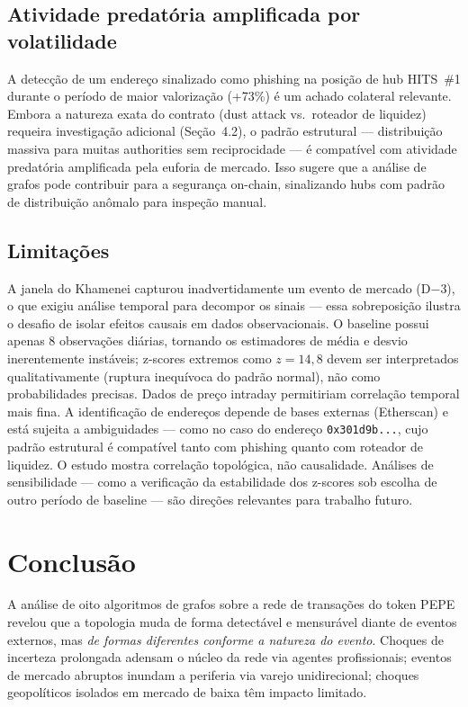 \documentclass[12pt,a4paper]{article}
\begin{document}
\subsection{Atividade predatória amplificada por volatilidade}

A detecção de um endereço sinalizado como phishing na posição de hub HITS~\#1 durante o período de maior valorização (+73\%) é um achado colateral relevante. Embora a natureza exata do contrato (dust attack vs.\ roteador de liquidez) requeira investigação adicional (Seção~4.2), o padrão estrutural --- distribuição massiva para muitas authorities sem reciprocidade --- é compatível com atividade predatória amplificada pela euforia de mercado. Isso sugere que a análise de grafos pode contribuir para a segurança on-chain, sinalizando hubs com padrão de distribuição anômalo para inspeção manual.

\subsection{Limitações}

A janela do Khamenei capturou inadvertidamente um evento de mercado (D$-$3), o que exigiu análise temporal para decompor os sinais --- essa sobreposição ilustra o desafio de isolar efeitos causais em dados observacionais. O baseline possui apenas 8 observações diárias, tornando os estimadores de média e desvio inerentemente instáveis; z-scores extremos como $z = 14{,}8$ devem ser interpretados qualitativamente (ruptura inequívoca do padrão normal), não como probabilidades precisas. Dados de preço intraday permitiriam correlação temporal mais fina. A identificação de endereços depende de bases externas (Etherscan) e está sujeita a ambiguidades --- como no caso do endereço \texttt{0x301d9b...}, cujo padrão estrutural é compatível tanto com phishing quanto com roteador de liquidez. O estudo mostra correlação topológica, não causalidade. Análises de sensibilidade --- como a verificação da estabilidade dos z-scores sob escolha de outro período de baseline --- são direções relevantes para trabalho futuro.

\section{Conclusão}

A análise de oito algoritmos de grafos sobre a rede de transações do token PEPE revelou que a topologia muda de forma detectável e mensurável diante de eventos externos, mas \textit{de formas diferentes conforme a natureza do evento}. Choques de incerteza prolongada adensam o núcleo da rede via agentes profissionais; eventos de mercado abruptos inundam a periferia via varejo unidirecional; choques geopolíticos isolados em mercado de baixa têm impacto limitado.
\end{document}
